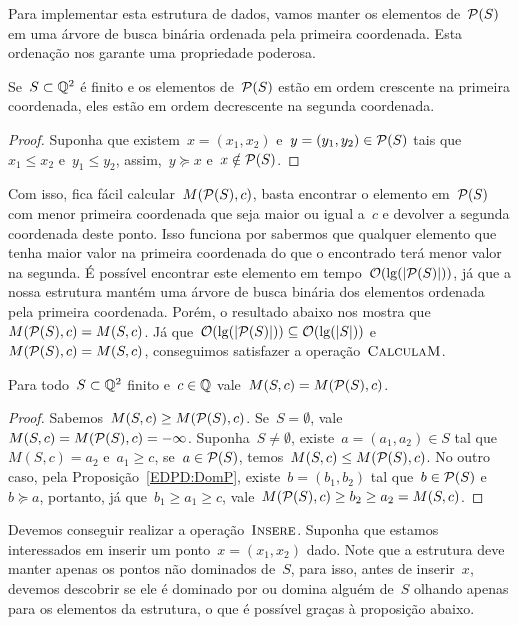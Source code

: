 Para implementar esta estrutura de dados, vamos manter os elementos de~$\mathcal{P}(S)$ em uma árvore de busca binária ordenada pela primeira coordenada. Esta ordenação nos garante uma propriedade poderosa.

\begin{prop} \label{EDPD:doubleorder}
Se~$S \subset \mathbb{Q}^2$ é finito e os elementos de~$\mathcal{P}(S)$ estão em ordem crescente na primeira coordenada, eles estão em ordem decrescente na segunda coordenada.
\end{prop}

\begin{proof}
Suponha que existem~$x = (x_1,x_2)$ e~$y = (y_1,y_2) \in \mathcal{P}(S)$ tais que~$x_1 \leq x_2$ e~$y_1 \leq y_2$, assim,~$y \succeq x$ e~$x \notin \mathcal{P}(S)$.
\end{proof}

Com isso, fica fácil calcular~$M(\mathcal{P}(S),c)$, basta encontrar o elemento em~$\mathcal{P}(S)$ com menor primeira coordenada que seja maior ou igual a~$c$ e devolver a segunda coordenada deste ponto. Isso funciona por sabermos que qualquer elemento que tenha maior valor na primeira coordenada do que o encontrado terá menor valor na segunda. É possível encontrar este elemento em tempo~$\mathcal{O}(\lg(|\mathcal{P}(S)|))$, já que a nossa estrutura mantém uma árvore de busca binária dos elementos ordenada pela primeira coordenada. Porém, o resultado abaixo nos mostra que~$M(\mathcal{P}(S),c) = M(S,c)$. Já que~${\mathcal{O}(\lg(|\mathcal{P}(S)|)) \subseteq \mathcal{O}(\lg(|S|))}$ e~$M(\mathcal{P}(S),c) = M(S,c)$, conseguimos satisfazer a operação~$\textsc{CalculaM}$.

\begin{prop}
Para todo~$S \subset \mathbb{Q}^2$ finito e~$c \in \mathbb{Q}$ vale~$M(S,c) = M(\mathcal{P}(S),c)$.
\end{prop}

\begin{proof}
Sabemos~$M(S,c) \geq M(\mathcal{P}(S),c)$. Se~$S = \emptyset$, vale~${M(S,c) = M(\mathcal{P}(S),c) = -\infty}$. Suponha~$S \neq \emptyset$, existe~$a=(a_1,a_2) \in S$ tal que~$M(S,c) = a_2$ e~$a_1 \geq c$, se~$a \in \mathcal{P}(S)$, temos~${M(S,c) \leq M(\mathcal{P}(S),c)}$. No outro caso, pela Proposição~\ref{EDPD:DomP}, existe~$b =(b_1,b_2)$ tal que~$b \in \mathcal{P}(S)$ e~$b \succeq a$, portanto, já que~$b_1 \geq a_1 \geq c$, vale~$M(\mathcal{P}(S),c) \geq b_2 \geq a_2 = M(S,c)$.
\end{proof}

Devemos conseguir realizar a operação~$\textsc{Insere}$. Suponha que estamos interessados em inserir um ponto~$x = (x_1,x_2)$ dado. Note que a estrutura deve manter apenas os pontos não dominados de~$S$, para isso, antes de inserir~$x$, devemos descobrir se ele é dominado por ou domina alguém de~$S$ olhando apenas para os elementos da estrutura, o que é possível graças à proposição abaixo.

